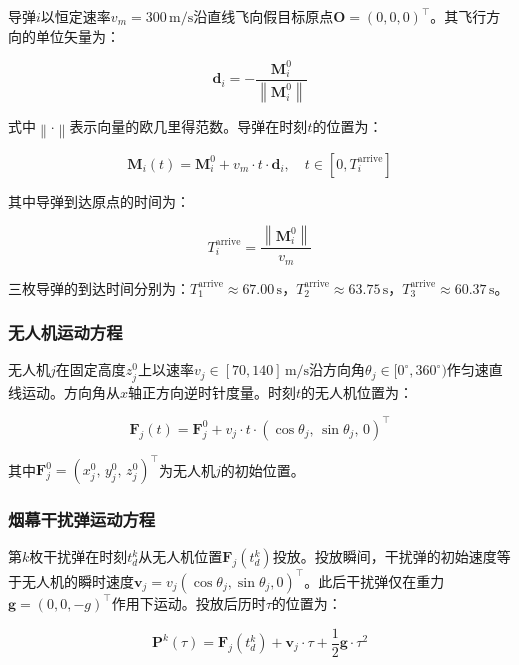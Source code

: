 \documentclass[12pt,a4paper]{ctexart}
\newcommand{\norm}[1]{\left\| #1 \right\|}
\newcommand{\vect}[1]{\boldsymbol{#1}}
\begin{document}
导弹$i$以恒定速率$v_m=300\,\text{m/s}$沿直线飞向假目标原点$\vect{O}=(0,0,0)^\top$。其飞行方向的单位矢量为：

\begin{equation}\label{eq:mdir}
\vect{d}_i = -\frac{\vect{M}_i^0}{\norm{\vect{M}_i^0}}
\end{equation}

式中$\norm{\cdot}$表示向量的欧几里得范数。导弹在时刻$t$的位置为：

\begin{equation}\label{eq:missile}
\vect{M}_i(t) = \vect{M}_i^0 + v_m \cdot t \cdot \vect{d}_i, \quad t \in [0, T_i^{\text{arrive}}]
\end{equation}

其中导弹到达原点的时间为：

\begin{equation}\label{eq:Tarrive}
T_i^{\text{arrive}} = \frac{\norm{\vect{M}_i^0}}{v_m}
\end{equation}

三枚导弹的到达时间分别为：$T_1^{\text{arrive}}\approx 67.00\,\text{s}$，$T_2^{\text{arrive}}\approx 63.75\,\text{s}$，$T_3^{\text{arrive}}\approx 60.37\,\text{s}$。

\subsubsection{无人机运动方程}

无人机$j$在固定高度$z_j^0$上以速率$v_j \in [70,140]\,\text{m/s}$沿方向角$\theta_j \in [0^\circ, 360^\circ)$作匀速直线运动。方向角从$x$轴正方向逆时针度量。时刻$t$的无人机位置为：

\begin{equation}\label{eq:uav}
\vect{F}_j(t) = \vect{F}_j^0 + v_j \cdot t \cdot (\cos\theta_j,\, \sin\theta_j,\, 0)^\top
\end{equation}

其中$\vect{F}_j^0 = (x_j^0,\, y_j^0,\, z_j^0)^\top$为无人机$j$的初始位置。

\subsubsection{烟幕干扰弹运动方程}

第$k$枚干扰弹在时刻$t_d^k$从无人机位置$\vect{F}_j(t_d^k)$投放。投放瞬间，干扰弹的初始速度等于无人机的瞬时速度$\vect{v}_j = v_j(\cos\theta_j, \sin\theta_j, 0)^\top$。此后干扰弹仅在重力$\vect{g}=(0,0,-g)^\top$作用下运动。投放后历时$\tau$的位置为：

\begin{equation}\label{eq:round}
\vect{P}^k(\tau) = \vect{F}_j(t_d^k) + \vect{v}_j \cdot \tau + \frac{1}{2}\vect{g} \cdot \tau^2
\end{equation}
\end{document}
